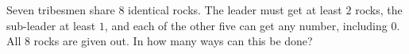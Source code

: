 Seven tribesmen share $8$ identical rocks. The leader must get at least $2$ rocks, the sub-leader at least $1$, and each of the other five can get any number, including $0$. All $8$ rocks are given out. In how many ways can this be done?
